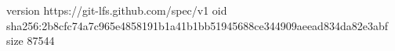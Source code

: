 version https://git-lfs.github.com/spec/v1
oid sha256:2b8cfc74a7c965e4858191b1a41b1bb51945688ce344909aeead834da82e3abf
size 87544
